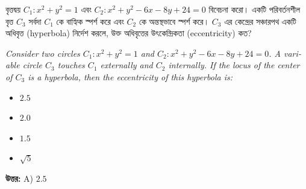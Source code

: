 \documentclass[12pt, a4paper]{article}
\begin{document}
\begin{tcolorbox}[questionbox={প্রশ্ন (Question) 20}]
    \noindent
    বৃত্তদ্বয় $C_1: x^2 + y^2 = 1$ এবং $C_2: x^2 + y^2 - 6x - 8y + 24 = 0$ বিবেচনা করো। একটি পরিবর্তনশীল বৃত্ত $C_3$ সর্বদা $C_1$ কে বাহ্যিক স্পর্শ করে এবং $C_2$ কে অন্তস্থভাবে স্পর্শ করে। $C_3$ এর কেন্দ্রের সঞ্চারপথ একটি অধিবৃত্ত (hyperbola) নির্দেশ করলে, উক্ত অধিবৃত্তের উৎকেন্দ্রিকতা (eccentricity) কত?
    
    \vspace{0.8em}
    \begin{english}
    \noindent\textit{\color{darkgray}
    Consider two circles $C_1: x^2 + y^2 = 1$ and $C_2: x^2 + y^2 - 6x - 8y + 24 = 0$. A variable circle $C_3$ touches $C_1$ externally and $C_2$ internally. If the locus of the center of $C_3$ is a hyperbola, then the eccentricity of this hyperbola is:
    }
    \end{english}
\end{tcolorbox}

\begin{itemize}[label={}, leftmargin=1cm, itemsep=0.5em]
    \item[\textbf{A)}] $2.5$
    \item[\textbf{B)}] $2.0$
    \item[\textbf{C)}] $1.5$
    \item[\textbf{D)}] $\sqrt{5}$
\end{itemize}

\vspace{0.5em}
\begin{tcolorbox}[answerbox]
    \textbf{\color{success} উত্তর:} A) $2.5$
\end{tcolorbox}
\vspace{1em}
\end{document}
